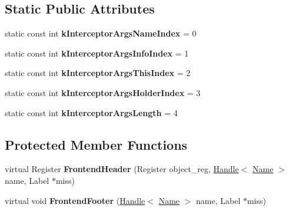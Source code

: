 \subsection*{Static Public Attributes}
\begin{DoxyCompactItemize}
\item 
\hypertarget{classv8_1_1internal_1_1_named_load_handler_compiler_a10e312b3b7e04901a0235d57be68e189}{}static const int {\bfseries k\+Interceptor\+Args\+Name\+Index} = 0\label{classv8_1_1internal_1_1_named_load_handler_compiler_a10e312b3b7e04901a0235d57be68e189}

\item 
\hypertarget{classv8_1_1internal_1_1_named_load_handler_compiler_a1550693ecdf4d8edcd1b81081978e2a6}{}static const int {\bfseries k\+Interceptor\+Args\+Info\+Index} = 1\label{classv8_1_1internal_1_1_named_load_handler_compiler_a1550693ecdf4d8edcd1b81081978e2a6}

\item 
\hypertarget{classv8_1_1internal_1_1_named_load_handler_compiler_a36622c1a3c3fd9469e1195465ae39d9e}{}static const int {\bfseries k\+Interceptor\+Args\+This\+Index} = 2\label{classv8_1_1internal_1_1_named_load_handler_compiler_a36622c1a3c3fd9469e1195465ae39d9e}

\item 
\hypertarget{classv8_1_1internal_1_1_named_load_handler_compiler_a83c9799650b422af9e4d82fb01b898b5}{}static const int {\bfseries k\+Interceptor\+Args\+Holder\+Index} = 3\label{classv8_1_1internal_1_1_named_load_handler_compiler_a83c9799650b422af9e4d82fb01b898b5}

\item 
\hypertarget{classv8_1_1internal_1_1_named_load_handler_compiler_abc10b90f6abcb5b3c8ae82addd6499c0}{}static const int {\bfseries k\+Interceptor\+Args\+Length} = 4\label{classv8_1_1internal_1_1_named_load_handler_compiler_abc10b90f6abcb5b3c8ae82addd6499c0}

\end{DoxyCompactItemize}
\subsection*{Protected Member Functions}
\begin{DoxyCompactItemize}
\item 
\hypertarget{classv8_1_1internal_1_1_named_load_handler_compiler_a7534bc644443ab1d2cb8217cbf69ab35}{}virtual Register {\bfseries Frontend\+Header} (Register object\+\_\+reg, \hyperlink{classv8_1_1internal_1_1_handle}{Handle}$<$ \hyperlink{classv8_1_1internal_1_1_name}{Name} $>$ name, Label $\ast$miss)\label{classv8_1_1internal_1_1_named_load_handler_compiler_a7534bc644443ab1d2cb8217cbf69ab35}

\item 
\hypertarget{classv8_1_1internal_1_1_named_load_handler_compiler_a377b8a231a1b049f808a0870929c837f}{}virtual void {\bfseries Frontend\+Footer} (\hyperlink{classv8_1_1internal_1_1_handle}{Handle}$<$ \hyperlink{classv8_1_1internal_1_1_name}{Name} $>$ name, Label $\ast$miss)\label{classv8_1_1internal_1_1_named_load_handler_compiler_a377b8a231a1b049f808a0870929c837f}

\end{DoxyCompactItemize}
